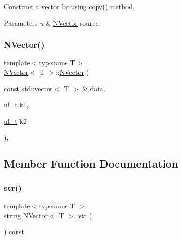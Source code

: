 Construct a vector by using {\ttfamily \mbox{\hyperlink{class_n_vector_a67128d2ff536b8ccd7a95cb680bd0431}{copy()}}} method. 


\begin{DoxyParams}{Parameters}
{\em u} & {\ttfamily \mbox{\hyperlink{class_n_vector}{N\+Vector}}} source. \\
\hline
\end{DoxyParams}
\mbox{\label{class_n_vector_a402111a5a467efd5741e6a17fbd5c903}} 
\subsubsection{\texorpdfstring{NVector()}{NVector()}\hspace{0.1cm}{\footnotesize\ttfamily [5/5]}}
{\footnotesize\ttfamily template$<$typename T$>$ \\
\mbox{\hyperlink{class_n_vector}{N\+Vector}}$<$ T $>$\+::\mbox{\hyperlink{class_n_vector}{N\+Vector}} (\begin{DoxyParamCaption}\item[{const std\+::vector$<$ T $>$ \&}]{data,  }\item[{\mbox{\hyperlink{group___n_algebra_ga1b140a2034db3f5dfe18a987745df43a}{ul\+\_\+t}}}]{k1,  }\item[{\mbox{\hyperlink{group___n_algebra_ga1b140a2034db3f5dfe18a987745df43a}{ul\+\_\+t}}}]{k2 }\end{DoxyParamCaption})\hspace{0.3cm}{\ttfamily [explicit]}, {\ttfamily [protected]}}



\subsection{Member Function Documentation}
\mbox{\label{class_n_vector_a6d66b06b953197c1b3965ed69f9fd17e}} 
\subsubsection{\texorpdfstring{str()}{str()}}
{\footnotesize\ttfamily template$<$typename T $>$ \\
string \mbox{\hyperlink{class_n_vector}{N\+Vector}}$<$ T $>$\+::str (\begin{DoxyParamCaption}{ }\end{DoxyParamCaption}) const\hspace{0.3cm}{\ttfamily [virtual]}}



